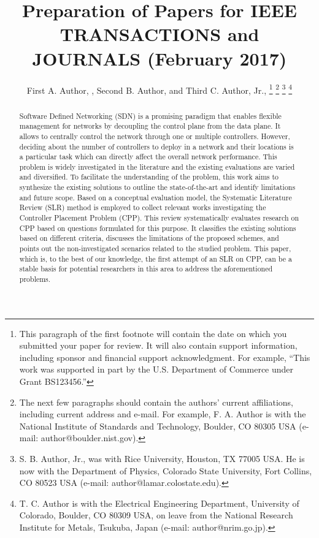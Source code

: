 \documentclass{IEEEtran}
\begin{document}
\title{Preparation of Papers for IEEE TRANSACTIONS and JOURNALS (February 2017)}
\author{First A. Author, , Second B. Author, and Third C. Author, Jr., 
\thanks{This paragraph of the first footnote will contain the date on 
which you submitted your paper for review. It will also contain support 
information, including sponsor and financial support acknowledgment. For 
example, ``This work was supported in part by the U.S. Department of 
Commerce under Grant BS123456.'' }
\thanks{The next few paragraphs should contain 
the authors' current affiliations, including current address and e-mail. For 
example, F. A. Author is with the National Institute of Standards and 
Technology, Boulder, CO 80305 USA (e-mail: author@boulder.nist.gov). }
\thanks{S. B. Author, Jr., was with Rice University, Houston, TX 77005 USA. He is 
now with the Department of Physics, Colorado State University, Fort Collins, 
CO 80523 USA (e-mail: author@lamar.colostate.edu).}
\thanks{T. C. Author is with 
the Electrical Engineering Department, University of Colorado, Boulder, CO 
80309 USA, on leave from the National Research Institute for Metals, 
Tsukuba, Japan (e-mail: author@nrim.go.jp).}}

\maketitle

\begin{abstract}
Software Defined Networking (SDN) is a promising paradigm that enables flexible management for networks by decoupling the control plane from the data plane. It allows to centrally control the network through one or multiple controllers. However, deciding about the number of controllers to deploy in a network and their locations is a particular task which can directly affect the overall network performance. This problem is widely investigated in the literature and the existing evaluations are  varied and diversified. To facilitate the understanding of the problem, this work aims to synthesize the existing solutions to outline the state-of-the-art and identify limitations and future scope. Based on a conceptual evaluation model, the Systematic Literature Review (SLR) method is employed to collect relevant works investigating the Controller Placement Problem (CPP). This review systematically evaluates research on CPP based on questions formulated for this purpose. It classifies the existing solutions based on different criteria, discusses the limitations of the proposed schemes, and points out the non-investigated scenarios related to the studied problem. This paper, which is, to the best of our knowledge, the first attempt of an SLR on CPP, can be a stable basis for potential researchers in this area to address the aforementioned problems.
\end{abstract}
\end{document}
